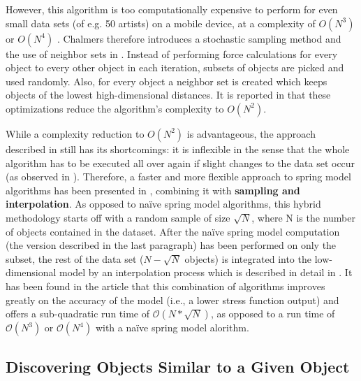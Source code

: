 However, this algorithm is too computationally expensive to perform for even small data sets (of e.g. 50 artists) on a mobile device, at a complexity of $O(N^3)$ or $O(N^4)$ \cite{Chalmers:1996:LIT:244979.245035}. Chalmers therefore introduces a stochastic sampling method and the use of neighbor sets in \cite{Chalmers:1996:LIT:244979.245035}. Instead of performing force calculations for every object to every other object in each iteration, subsets of objects are picked and used randomly. Also, for every object a neighbor set is created which keeps objects of the lowest high-dimensional distances. It is reported in \cite{Chalmers:1996:LIT:244979.245035} that these optimizations reduce the algorithm's complexity to $O(N^2)$.

While a complexity reduction to $O(N^2)$ is advantageous, the approach described in \cite{Chalmers:1996:LIT:244979.245035} still has its shortcomings: it is inflexible in the sense that the whole algorithm has to be executed all over again if slight changes to the data set occur (as observed in \cite{Morrison:2003:FMS}). Therefore, a faster and more flexible approach to spring model algorithms has been presented in \cite{Morrison:2003:FMS}, combining it with \textbf{sampling and interpolation}. As opposed to naïve spring model algorithms, this hybrid methodology starts off with a random sample of size $\sqrt{N}$, where N is the number of objects contained in the dataset. After the naïve spring model computation (the version described in the last paragraph) has been performed on only the subset, the rest of the data set ($N - \sqrt{N}$ objects) is integrated into the low-dimensional model by an interpolation process which is described in detail in \cite{Morrison:2003:FMS}. It has been found in the article that this combination of algorithms improves greatly on the accuracy of the model (i.e., a lower stress function output) and offers a sub-quadratic run time of $\mathcal O(N*\sqrt{N})$, as opposed to a run time of $\mathcal O(N^3)$ or $\mathcal O(N^4)$ with a naïve spring model alorithm.


\subsection{Discovering Objects Similar to a Given Object}

